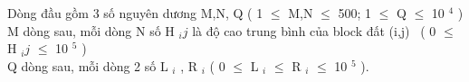 Dòng đầu gồm 3 số nguyên dương M,N, Q ( 1  $\le$  M,N  $\le$  500; 1  $\le$  Q  $\le$  10 $^ 4 $ )
\\M dòng sau, mỗi dòng N số H $_ ij $ là độ cao trung bình của block đất (i,j)  ( 0  $\le$  H $_ ij $  $\le$  10 $^ 5 $ )
\\Q dòng sau, mỗi dòng 2 số L $_ i $ , R $_ i $ ( 0  $\le$  L $_ i $  $\le$  R $_ i $  $\le$  10 $^ 5 $ ).